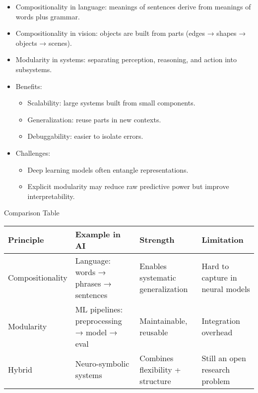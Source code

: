 \documentclass[
  letterpaper,
  DIV=11,
  numbers=noendperiod]{scrreprt}
\providecommand{\tightlist}{%
  \setlength{\itemsep}{0pt}\setlength{\parskip}{0pt}}
\begin{document}
\begin{itemize}
\item
  Compositionality in language: meanings of sentences derive from
  meanings of words plus grammar.
\item
  Compositionality in vision: objects are built from parts (edges →
  shapes → objects → scenes).
\item
  Modularity in systems: separating perception, reasoning, and action
  into subsystems.
\item
  Benefits:

  \begin{itemize}
  \tightlist
  \item
    Scalability: large systems built from small components.
  \item
    Generalization: reuse parts in new contexts.
  \item
    Debuggability: easier to isolate errors.
  \end{itemize}
\item
  Challenges:

  \begin{itemize}
  \tightlist
  \item
    Deep learning models often entangle representations.
  \item
    Explicit modularity may reduce raw predictive power but improve
    interpretability.
  \end{itemize}
\end{itemize}

Comparison Table

\begin{longtable}[]{@{}
  >{\raggedright\arraybackslash}p{}
  >{\raggedright\arraybackslash}p{}
  >{\raggedright\arraybackslash}p{}
  >{\raggedright\arraybackslash}p{}@{}}
\toprule\noalign{}
\begin{minipage}[b]{\linewidth}\raggedright
Principle
\end{minipage} & \begin{minipage}[b]{\linewidth}\raggedright
Example in AI
\end{minipage} & \begin{minipage}[b]{\linewidth}\raggedright
Strength
\end{minipage} & \begin{minipage}[b]{\linewidth}\raggedright
Limitation
\end{minipage} \\
\midrule\noalign{}
\endhead
\bottomrule\noalign{}
\endlastfoot
Compositionality & Language: words → phrases → sentences & Enables
systematic generalization & Hard to capture in neural models \\
Modularity & ML pipelines: preprocessing → model → eval & Maintainable,
reusable & Integration overhead \\
Hybrid & Neuro-symbolic systems & Combines flexibility + structure &
Still an open research problem \\
\end{longtable}
\end{document}
